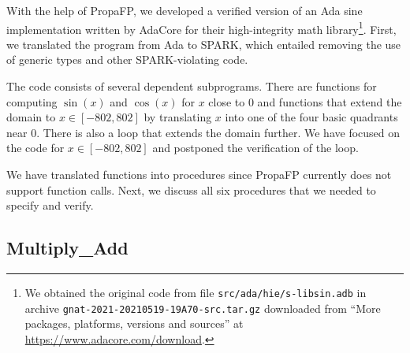 \documentclass[runningheads]{llncs}
\begin{document}
With the help of PropaFP, we developed a verified version of an Ada sine implementation written by AdaCore for their high-integrity math library\footnote{We obtained the original code from file \texttt{src/ada/hie/s-libsin.adb} in archive \texttt{gnat-2021-20210519-19A70-src.tar.gz} downloaded from ``More packages, platforms, versions and sources'' at \url{https://www.adacore.com/download}.}.
First, we translated the program from Ada to SPARK, which entailed removing the use of generic types and other SPARK-violating code.

The code consists of several dependent subprograms.  
There are functions for computing $\sin(x)$ and $\cos(x)$ for $x$ close to $0$ and functions that extend the domain to $x\in [-802,802]$ by translating $x$ into one of the four basic quadrants near $0$.
There is also a loop that extends the domain further.
We have focused on the code for $x \in [-802,802]$ and postponed the verification of the loop.

We have translated functions into procedures since PropaFP currently does not support function calls.
%
Next, we discuss all six procedures that we needed to specify and verify.


\subsection{Multiply\_Add}
\end{document}
